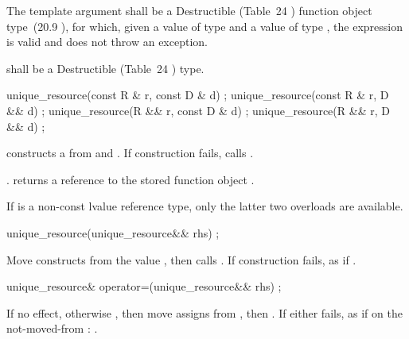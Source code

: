 \documentclass[ebook,11pt,article]{memoir}
\begin{document}
\pnum 
The template argument
 shall be a 
Destructible 
(Table~24
) function object type~(20.9
), 
for which, given
a value  of type  and a value
 of type , the expression
 is valid and does not throw an exception.

\pnum
{} shall be a
Destructible 
(Table~24
) type.

\begin{itemdecl}
  unique_resource(const R & r, const D & d) ;
  unique_resource(const R & r, D && d) ;
  unique_resource(R && r, const D & d) ;
  unique_resource(R && r, D && d) ;
\end{itemdecl}

\begin{itemdescr}
\pnum
\effects constructs a  from  and . If construction fails, calls .

\pnum
\postconditions {}.
 returns a reference to the stored
function object .

\pnum
\enternote
If  is a non-const lvalue reference type, only the latter two overloads are available. %
\exitnote
\end{itemdescr}

\begin{itemdecl}
unique_resource(unique_resource&& rhs) ;
\end{itemdecl}

\pnum
\effects Move constructs from the value , then calls . If construction fails, as if .

\begin{itemdecl}
unique_resource& operator=(unique_resource&& rhs) ;
\end{itemdecl}
\pnum
\effects If  no effect, otherwise , then move assigns from , then . If either fails, as if on the not-moved-from : .
\end{document}
